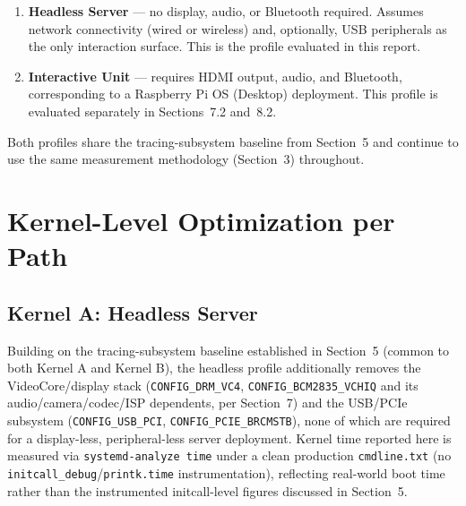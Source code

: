 \documentclass[11pt,a4paper]{article}
\begin{document}
\begin{enumerate}
    \item \textbf{Headless Server} — no display, audio, or Bluetooth required. Assumes network connectivity (wired or wireless) and, optionally, USB peripherals as the only interaction surface. This is the profile evaluated in this report.
    \item \textbf{Interactive Unit} — requires HDMI output, audio, and Bluetooth, corresponding to a Raspberry Pi OS (Desktop) deployment. This profile is evaluated separately in Sections~7.2 and~8.2.
\end{enumerate}

Both profiles share the tracing-subsystem baseline from Section~5 and continue to use the same measurement methodology (Section~3) throughout.

\section{Kernel-Level Optimization per Path}
 
\subsection{Kernel A: Headless Server}
 
Building on the tracing-subsystem baseline established in Section~5 (common to both Kernel A and Kernel B), the headless profile additionally removes the VideoCore/display stack (\texttt{CONFIG\_DRM\_VC4}, \texttt{CONFIG\_BCM2835\_VCHIQ} and its audio/camera/codec/ISP dependents, per Section~7) and the USB/PCIe subsystem (\texttt{CONFIG\_USB\_PCI}, \texttt{CONFIG\_PCIE\_BRCMSTB}), none of which are required for a display-less, peripheral-less server deployment. Kernel time reported here is measured via \texttt{systemd-analyze time} under a clean production \texttt{cmdline.txt} (no \texttt{initcall\_debug}/\texttt{printk.time} instrumentation), reflecting real-world boot time rather than the instrumented initcall-level figures discussed in Section~5.
 
\end{document}
